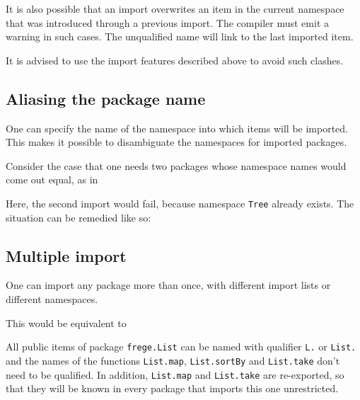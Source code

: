 It is also possible that an import overwrites an item in the current namespace that was introduced through a previous import.
The compiler must emit a warning in such cases.
The unqualified name will link to the last imported item.

It is advised to use the import features described above to avoid such clashes.

\subsection{Aliasing the package name}
One can specify the name of the namespace into which
items will be imported. This makes it possible to disambiguate the
namespaces for imported packages.

Consider the case that one needs two packages whose namespace names would come out equal, as in


Here, the second import would fail, because namespace \texttt{Tree} already
exists. The situation can be remedied like so:


\subsection{Multiple import}
One can import any package more than once, with different import
lists or different namespaces. 


This would be equivalent to 


All public items of package \texttt{frege.List} can be named with qualifier \texttt{L.} or \texttt{List.} 
and the names of the functions \texttt{List.map},  \texttt{List.sortBy} and  \texttt{List.take} don't need to be qualified. 
In addition, \texttt{List.map} and \texttt{List.take} are re-exported, so that they will be known in every package that imports this one unrestricted.

